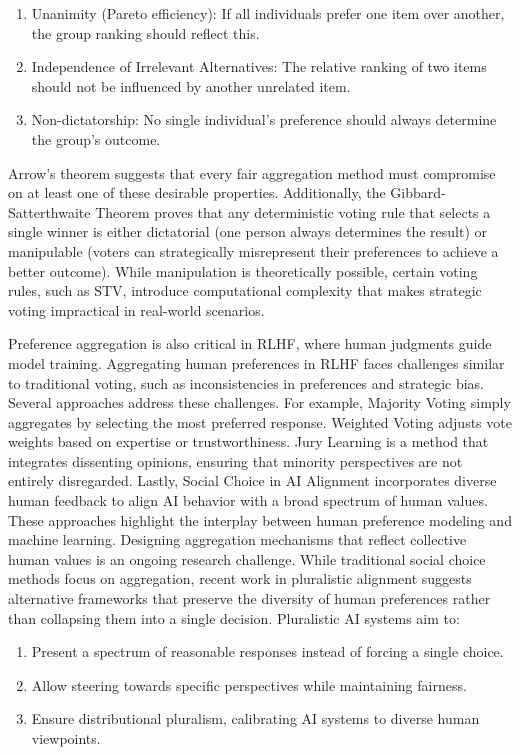 \documentclass[
  letterpaper,
  numbers=noenddot,
  DIV=11]{scrreprt}
\providecommand{\tightlist}{%
  \setlength{\itemsep}{0pt}\setlength{\parskip}{0pt}}\usepackage{longtable,booktabs,array}
\theoremstyle{plain}
\theoremstyle{definition}
\theoremstyle{plain}
\theoremstyle{remark}
\begin{document}
\begin{enumerate}
\def\labelenumi{\arabic{enumi}.}
\tightlist
\item
  Unanimity (Pareto efficiency): If all individuals prefer one item over
  another, the group ranking should reflect this.
\item
  Independence of Irrelevant Alternatives: The relative ranking of two
  items should not be influenced by another unrelated item.
\item
  Non-dictatorship: No single individual's preference should always
  determine the group's outcome.
\end{enumerate}

Arrow's theorem suggests that every fair aggregation method must
compromise on at least one of these desirable properties. Additionally,
the Gibbard-Satterthwaite Theorem proves that any deterministic voting
rule that selects a single winner is either dictatorial (one person
always determines the result) or manipulable (voters can strategically
misrepresent their preferences to achieve a better outcome). While
manipulation is theoretically possible, certain voting rules, such as
STV, introduce computational complexity that makes strategic voting
impractical in real-world scenarios.

Preference aggregation is also critical in RLHF, where human judgments
guide model training. Aggregating human preferences in RLHF faces
challenges similar to traditional voting, such as inconsistencies in
preferences and strategic bias. Several approaches address these
challenges. For example, Majority Voting simply aggregates by selecting
the most preferred response. Weighted Voting adjusts vote weights based
on expertise or trustworthiness. Jury Learning is a method that
integrates dissenting opinions, ensuring that minority perspectives are
not entirely disregarded. Lastly, Social Choice in AI Alignment
incorporates diverse human feedback to align AI behavior with a broad
spectrum of human values. These approaches highlight the interplay
between human preference modeling and machine learning. Designing
aggregation mechanisms that reflect collective human values is an
ongoing research challenge. While traditional social choice methods
focus on aggregation, recent work in pluralistic alignment suggests
alternative frameworks that preserve the diversity of human preferences
rather than collapsing them into a single decision. Pluralistic AI
systems aim to:

\begin{enumerate}
\def\labelenumi{\arabic{enumi}.}
\tightlist
\item
  Present a spectrum of reasonable responses instead of forcing a single
  choice.
\item
  Allow steering towards specific perspectives while maintaining
  fairness.
\item
  Ensure distributional pluralism, calibrating AI systems to diverse
  human viewpoints.
\end{enumerate}
\end{document}
